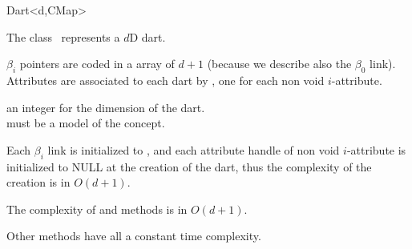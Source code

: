 \ccRefPageBegin
\begin{ccRefClass}{Dart<d,CMap>}


\ccDefinition
  
The class \ccRefName\ represents a $d$D dart.

$\beta_i$ pointers are coded in a array of $d+1$ 
(because we describe also the $\beta_0$ link).  Attributes are
associated to each dart by , one for each
non void $i$-attribute.

\ccIsModel
{}

\ccParameters
{} an integer for the dimension of the dart.\\
 must be a model of the  concept.


\ccTypes
{}
\ccGlue
{}

\ccGlue
{}


Each $\beta_i$ link is initialized to , and each 
attribute handle of non void $i$-attribute is initialized to NULL
at the creation of the dart, thus the complexity of the creation is in
$O(d+1)$.

The complexity of  and  methods is in
$O(d+1)$.

Other methods have all a constant time complexity.

\ccSeeAlso
{}

\end{ccRefClass}
\ccRefPageEnd
